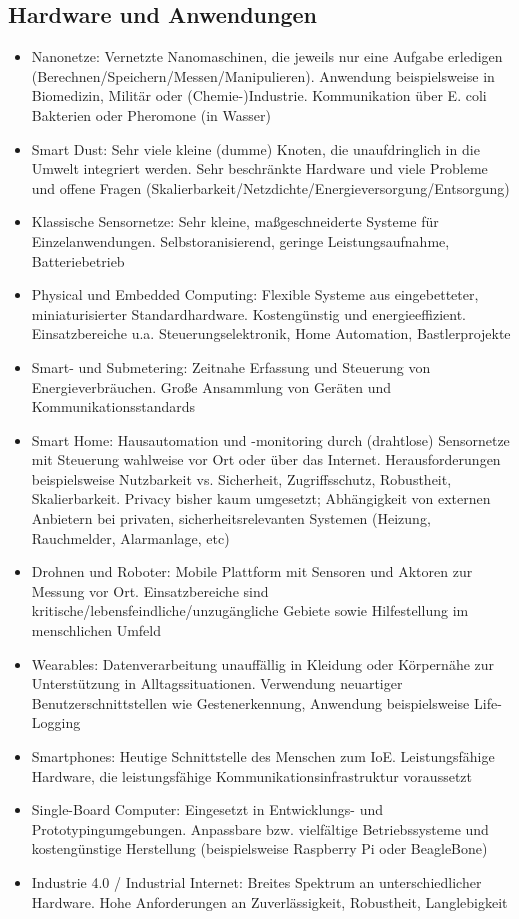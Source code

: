 \subsection{Hardware und Anwendungen}
\begin{itemize}
	\item Nanonetze: Vernetzte Nanomaschinen, die jeweils nur eine Aufgabe erledigen (Berechnen/Speichern/Messen/Manipulieren). Anwendung beispielsweise in Biomedizin, Militär oder (Chemie-)Industrie. Kommunikation über E. coli Bakterien oder Pheromone (in Wasser)
	\item Smart Dust: Sehr viele kleine (dumme) Knoten, die unaufdringlich in die Umwelt integriert werden. Sehr beschränkte Hardware und viele Probleme und offene Fragen (Skalierbarkeit/Netzdichte/Energieversorgung/Entsorgung)
	\item Klassische Sensornetze: Sehr kleine, maßgeschneiderte Systeme für Einzelanwendungen. Selbstoranisierend, geringe Leistungsaufnahme, Batteriebetrieb
	\item Physical und Embedded Computing: Flexible Systeme aus eingebetteter, miniaturisierter Standardhardware. Kostengünstig und energieeffizient. Einsatzbereiche u.a. Steuerungselektronik, Home Automation, Bastlerprojekte
	\item Smart- und Submetering: Zeitnahe Erfassung und Steuerung von Energieverbräuchen. Große Ansammlung von Geräten und Kommunikationsstandards
	\item Smart Home: Hausautomation und -monitoring durch (drahtlose) Sensornetze mit Steuerung wahlweise vor Ort oder über das Internet. Herausforderungen beispielsweise Nutzbarkeit vs. Sicherheit, Zugriffsschutz, Robustheit, Skalierbarkeit. Privacy bisher kaum umgesetzt; Abhängigkeit von externen Anbietern bei privaten, sicherheitsrelevanten Systemen (Heizung, Rauchmelder, Alarmanlage, etc)
	\item Drohnen und Roboter: Mobile Plattform mit Sensoren und Aktoren zur Messung vor Ort. Einsatzbereiche sind kritische/lebensfeindliche/unzugängliche Gebiete sowie Hilfestellung im menschlichen Umfeld
	\item Wearables: Datenverarbeitung unauffällig in Kleidung oder Körpernähe zur Unterstützung in Alltagssituationen. Verwendung neuartiger Benutzerschnittstellen wie Gestenerkennung, Anwendung beispielsweise Life-Logging
	\item Smartphones: Heutige Schnittstelle des Menschen zum IoE. Leistungsfähige Hardware, die leistungsfähige Kommunikationsinfrastruktur voraussetzt
	\item Single-Board Computer: Eingesetzt in Entwicklungs- und Prototypingumgebungen. Anpassbare bzw. vielfältige Betriebssysteme und kostengünstige Herstellung (beispielsweise Raspberry Pi oder BeagleBone)
	\item Industrie 4.0 / Industrial Internet: Breites Spektrum an unterschiedlicher Hardware. Hohe Anforderungen an Zuverlässigkeit, Robustheit, Langlebigkeit
\end{itemize}


